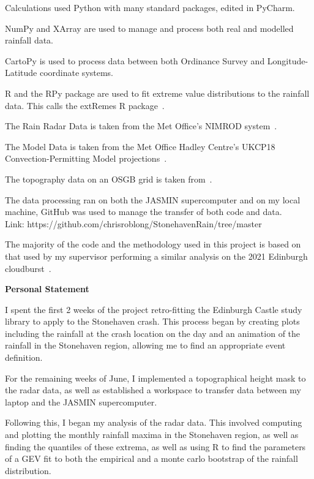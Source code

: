 \documentclass[12pt,a4paper,openany]{report}
\begin{document}
\bigskip

Calculations used Python with many standard packages, edited in PyCharm.

NumPy and XArray are used to manage and process both real and modelled rainfall data.

CartoPy is used to process data between both Ordinance Survey and Longitude-Latitude coordinate systems.

R and the RPy package are used to fit extreme value distributions to the rainfall data.
This calls the extRemes R package~\cite{extremes_R}.

The Rain Radar Data is taken from the Met Office's NIMROD system~\cite{radar_data}.

The Model Data is taken from the Met Office Hadley Centre's UKCP18 Convection-Permitting Model projections~\cite{model_data}.

The topography data on an OSGB grid is taken from~\cite{radar_topog}.

The data processing ran on both the JASMIN supercomputer and on my local machine,
GitHub was used to manage the transfer of both code and data. \\
Link: https://github.com/chrisroblong/StonehavenRain/tree/master

The majority of the code and the methodology used in this project is based on that used by my supervisor performing a similar analysis on the 2021 Edinburgh cloudburst~\cite{Tett_Soon}.


\newpage

\begin{center}
\textbf{Personal Statement} %
\end{center}

I spent the first 2 weeks of the project retro-fitting the Edinburgh Castle study
library to apply to the Stonehaven crash.
This process began by creating plots including the
rainfall at the crash location on the day and an animation of the rainfall
in the Stonehaven region, allowing me to find an appropriate event definition.

For the remaining weeks of June, I implemented a topographical height mask
to the radar data, as well as established a workspace to transfer data between
my laptop and the JASMIN supercomputer.

Following this, I began my analysis of the radar data.
This involved computing and plotting the monthly rainfall maxima in
the Stonehaven region, as well as finding the quantiles of these extrema,
as well as using R to find the parameters of a GEV fit to both the empirical
and a monte carlo bootstrap of the rainfall distribution.
\end{document}
